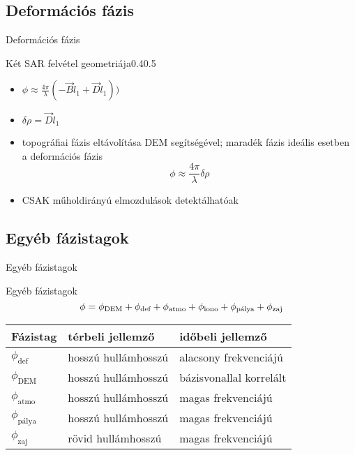 \def\ft{Deformációs fázis}
\subsection{\ft}

\begin{frame}{\ft}
    \begin{figp}{}{Két SAR felvétel geometriája}{0.4}{0.5}
        \begin{itemize}
            \item $\phi \approx \frac{4\pi}{\lambda} (- \vec{B}\hat{l}_1 + \vec{D}\hat{l}_1))$
            \item $\delta\rho = \vec{D}\hat{l}_1$
            \item topográfiai fázis eltávolítása DEM segítségével; maradék fázis ideális esetben a deformációs fázis $$\phi \approx \frac{4\pi}{\lambda}\delta\rho$$
            \item CSAK műholdirányú elmozdulások detektálhatóak
        \end{itemize}
    \end{figp}
\end{frame}


\def\ft{Egyéb fázistagok}
\subsection{\ft}


\begin{frame}{\ft}
    \begin{minic}{0.75}
    \end{minic}
\end{frame}

\begin{frame}{\ft}
    $$ \phi = \phi_{\text{DEM}} + \phi_{\text{def}} + \phi_{\text{atmo}} + \phi_{\text{iono}} + \phi_{\text{pálya}} + \phi_{\text{zaj}} $$
    \begin{table}[H]
        \centering
        \begin{tabular}{l l l} \toprule
            Fázistag & térbeli jellemző & időbeli jellemző\\ \midrule
            $\phi_{\text{def}}$ & hosszú hullámhosszú & alacsony frekvenciájú\\
            $\phi_{\text{DEM}}$ & hosszú hullámhosszú & bázisvonallal korrelált \\
            $\phi_{\text{atmo}}$ & hosszú hullámhosszú & magas frekvenciájú\\
            $\phi_{\text{pálya}}$ & hosszú hullámhosszú & magas frekvenciájú \\
            $\phi_{\text{zaj}}$ & rövid hullámhosszú & magas frekvenciájú \\ \bottomrule
        \end{tabular}
    \end{table}
    \cite{Hooper2012}
\end{frame}

